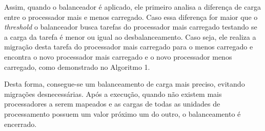 \begin{table}[h]
	\centering
\end{table} 

Assim, quando o balanceador é aplicado, ele primeiro analisa a diferença de carga entre o processador mais e menos carregado. Caso essa diferença for maior que o \textit{threshold} o balanceador busca tarefas do processador mais carregado testando se a carga da tarefa é menor ou igual ao desbalanceamento. Caso seja, ele realiza a migração desta tarefa do processador mais carregado para o menos carregado e encontra o novo processador mais carregado e o novo processador menos carregado, como demonstrado no Algoritmo 1. 

Desta forma, consegue-se um balanceamento de carga mais preciso, evitando migrações desnecessárias. Após a execução, quando não existem mais processadores a serem mapeados e as cargas de todas as unidades de processamento possuem um valor próximo um do outro, o balanceamento é encerrado. 
